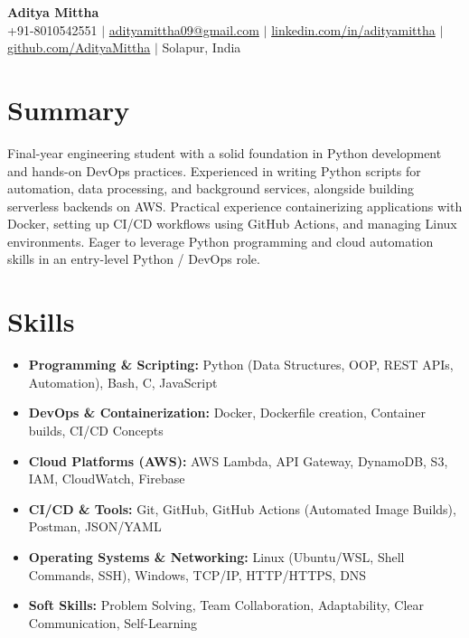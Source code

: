 \documentclass[letterpaper,10pt]{article}
\begin{document}
\begin{center}
  {\LARGE \textbf{Aditya Mittha}} \\[3pt]
  \small
  +91-8010542551 \enspace $|$ \enspace
  \href{mailto:adityamittha09@gmail.com}{adityamittha09@gmail.com} \enspace $|$ \enspace
  \href{https://www.linkedin.com/in/adityamittha}{linkedin.com/in/adityamittha} \enspace $|$ \enspace
  \href{https://github.com/AdityaMittha}{github.com/AdityaMittha} \enspace $|$ \enspace
  Solapur, India
\end{center}

\vspace{-14pt}

\section{Summary}
\small
Final-year engineering student with a solid foundation in Python development and hands-on DevOps practices. Experienced in writing Python scripts for automation, data processing, and background services, alongside building serverless backends on AWS. Practical experience containerizing applications with Docker, setting up CI/CD workflows using GitHub Actions, and managing Linux environments. Eager to leverage Python programming and cloud automation skills in an entry-level Python / DevOps role.

\vspace{-4pt}

\section{Skills}
\small
\begin{itemize}[leftmargin=0.18in, label={}, topsep=0pt, parsep=1pt, itemsep=1pt]
  \item \textbf{Programming \& Scripting:} Python (Data Structures, OOP, REST APIs, Automation), Bash, C, JavaScript
  \item \textbf{DevOps \& Containerization:} Docker, Dockerfile creation, Container builds, CI/CD Concepts
  \item \textbf{Cloud Platforms (AWS):} AWS Lambda, API Gateway, DynamoDB, S3, IAM, CloudWatch, Firebase
  \item \textbf{CI/CD \& Tools:} Git, GitHub, GitHub Actions (Automated Image Builds), Postman, JSON/YAML
  \item \textbf{Operating Systems \& Networking:} Linux (Ubuntu/WSL, Shell Commands, SSH), Windows, TCP/IP, HTTP/HTTPS, DNS
  \item \textbf{Soft Skills:} Problem Solving, Team Collaboration, Adaptability, Clear Communication, Self-Learning
\end{itemize}
\end{document}
